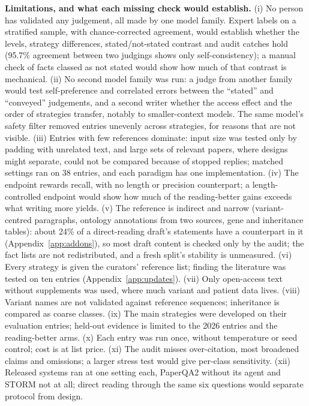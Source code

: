 \documentclass{article} %
\begin{document}
\textbf{Limitations, and what each missing check would establish.} (i) No person has validated any judgement, all made by one model family. Expert labels on a stratified sample, with chance-corrected agreement, would establish whether the levels, strategy differences, stated/not-stated contrast and audit catches hold (95.7\% agreement between two judgings shows only self-consistency); a manual check of facts classed as not stated would show how much of that contrast is mechanical. (ii) No second model family was run: a judge from another family would test self-preference and correlated errors between the ``stated'' and ``conveyed'' judgements, and a second writer whether the access effect and the order of strategies transfer, notably to smaller-context models. The same model's safety filter removed entries unevenly across strategies, for reasons that are not visible. (iii) Entries with few references dominate: input size was tested only by padding with unrelated text, and large sets of relevant papers, where designs might separate, could not be compared because of stopped replies; matched settings ran on 38 entries, and each paradigm has one implementation. (iv) The endpoint rewards recall, with no length or precision counterpart; a length-controlled endpoint would show how much of the reading-better gains exceeds what writing more yields. (v) The reference is indirect and narrow (variant-centred paragraphs, ontology annotations from two sources, gene and inheritance tables): about 24\% of a direct-reading draft's statements have a counterpart in it (Appendix~\ref{app:addons}), so most draft content is checked only by the audit; the fact lists are not redistributed, and a fresh split's stability is unmeasured. (vi) Every strategy is given the curators' reference list; finding the literature was tested on ten entries (Appendix~\ref{app:updates}). (vii) Only open-access text without supplements was used, where much variant and patient data lives. (viii) Variant names are not validated against reference sequences; inheritance is compared as coarse classes. (ix) The main strategies were developed on their evaluation entries; held-out evidence is limited to the 2026 entries and the reading-better arms. (x) Each entry was run once, without temperature or seed control; cost is at list price. (xi) The audit misses over-citation, most broadened claims and omissions; a larger stress test would give per-class sensitivity. (xii) Released systems ran at one setting each, PaperQA2 without its agent and STORM not at all; direct reading through the same six questions would separate protocol from design.
\end{document}
